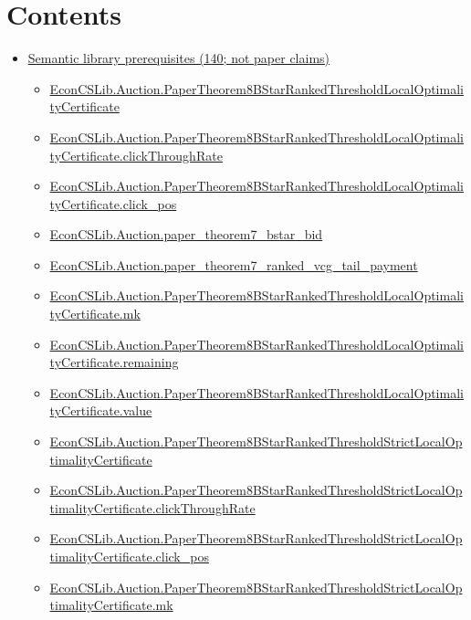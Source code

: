 \documentclass[10pt]{article}
\begin{document}
\section*{Contents}
\begin{itemize}[leftmargin=1.2em]
\item \hyperlink{library-section-715fe1539438471f}{Semantic library prerequisites (140; not paper claims)}
\begin{itemize}[leftmargin=1.2em]
\item \hyperlink{library-prerequisite-658baaeb699a2abb}{EconCSLib.Auction.PaperTheorem8BStarRankedThresholdLocalOptimalityCertificate}
\item \hyperlink{library-prerequisite-663e0edb7c9a7c8a}{EconCSLib.Auction.PaperTheorem8BStarRankedThresholdLocalOptimalityCertificate.clickThroughRate}
\item \hyperlink{library-prerequisite-e8c438fc2f504dcf}{EconCSLib.Auction.PaperTheorem8BStarRankedThresholdLocalOptimalityCertificate.click\_pos}
\item \hyperlink{library-prerequisite-096e2c70579eed44}{EconCSLib.Auction.paper\_theorem7\_bstar\_bid}
\item \hyperlink{library-prerequisite-5bc3ccaed60d16b6}{EconCSLib.Auction.paper\_theorem7\_ranked\_vcg\_tail\_payment}
\item \hyperlink{library-prerequisite-a7c206ac3fd97cfa}{EconCSLib.Auction.PaperTheorem8BStarRankedThresholdLocalOptimalityCertificate.mk}
\item \hyperlink{library-prerequisite-50ce1566f44cc4b4}{EconCSLib.Auction.PaperTheorem8BStarRankedThresholdLocalOptimalityCertificate.remaining}
\item \hyperlink{library-prerequisite-48e1f1812fca2893}{EconCSLib.Auction.PaperTheorem8BStarRankedThresholdLocalOptimalityCertificate.value}
\item \hyperlink{library-prerequisite-bed246ab07f165a8}{EconCSLib.Auction.PaperTheorem8BStarRankedThresholdStrictLocalOptimalityCertificate}
\item \hyperlink{library-prerequisite-866e495732a2fe24}{EconCSLib.Auction.PaperTheorem8BStarRankedThresholdStrictLocalOptimalityCertificate.clickThroughRate}
\item \hyperlink{library-prerequisite-8e5c6858e9d66924}{EconCSLib.Auction.PaperTheorem8BStarRankedThresholdStrictLocalOptimalityCertificate.click\_pos}
\item \hyperlink{library-prerequisite-f1f4b5ac97c8f962}{EconCSLib.Auction.PaperTheorem8BStarRankedThresholdStrictLocalOptimalityCertificate.mk}

\end{itemize}
\end{itemize}
\end{document}
